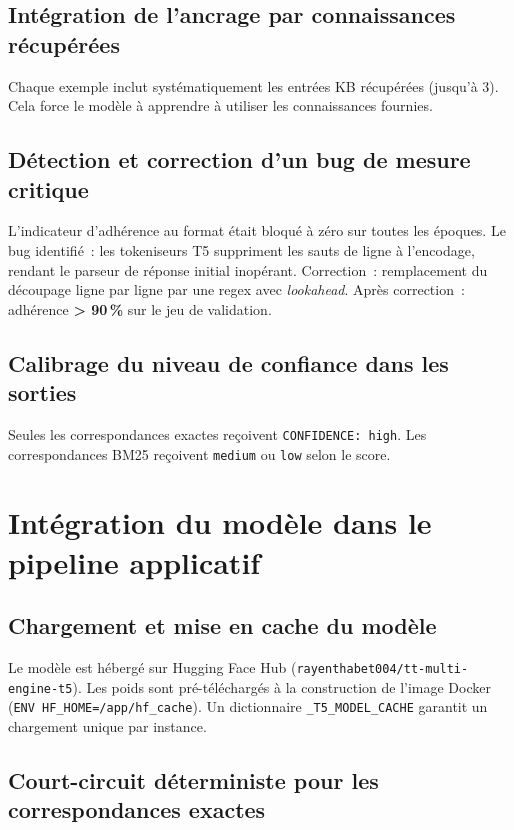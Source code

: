 \documentclass[12pt,a4paper]{report}
\begin{document}
\subsection{Int\'egration de l'ancrage par connaissances r\'ecup\'er\'ees}

Chaque exemple inclut syst\'ematiquement les entr\'ees KB r\'ecup\'er\'ees (jusqu'\`a
3). Cela force le mod\`ele \`a apprendre \`a utiliser les connaissances fournies.

\subsection{D\'etection et correction d'un bug de mesure critique}

L'indicateur d'adh\'erence au format \'etait bloqu\'e \`a z\'ero sur toutes les
\'epoques. Le bug identifi\'e~: les tokeniseurs T5 suppriment les sauts de ligne \`a
l'encodage, rendant le parseur de r\'eponse initial inop\'erant. Correction~:
remplacement du d\'ecoupage ligne par ligne par une regex avec \emph{lookahead}.
Apr\`es correction~: adh\'erence \textbf{> 90\,\%} sur le jeu de validation.

\subsection{Calibrage du niveau de confiance dans les sorties}

Seules les correspondances exactes re\c coivent \texttt{CONFIDENCE: high}. Les
correspondances BM25 re\c coivent \texttt{medium} ou \texttt{low} selon le score.

\section{Int\'egration du mod\`ele dans le pipeline applicatif}

\subsection{Chargement et mise en cache du mod\`ele}

Le mod\`ele est h\'eberg\'e sur Hugging Face Hub
(\texttt{rayenthabet004/tt-multi-engine-t5}). Les poids sont pr\'e-t\'el\'echarg\'es
\`a la construction de l'image Docker (\texttt{ENV HF\_HOME=/app/hf\_cache}).
Un dictionnaire \texttt{\_T5\_MODEL\_CACHE} garantit un chargement unique par instance.

\subsection{Court-circuit d\'eterministe pour les correspondances exactes}
\end{document}
